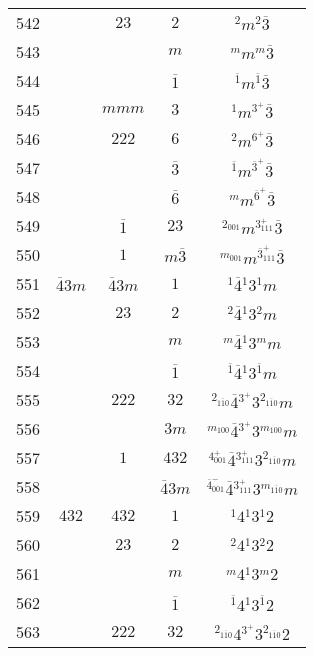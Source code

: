 \begin{longtable}{ccccc}
  542 &  & $23$ & $2$ & ${}^{2} m {}^{2} \overline{3} $\\
  543 &  &  & $m$ & ${}^{m} m {}^{m} \overline{3} $\\
  544 &  &  & $\overline{1}$ & ${}^{\overline{1}} m {}^{\overline{1}} \overline{3} $\\
  545 &  & $mmm$ & $3$ & ${}^{1} m {}^{3^{+}} \overline{3} $\\
  546 &  & $222$ & $6$ & ${}^{2} m {}^{6^{+}} \overline{3} $\\
  547 &  &  & $\overline{3}$ & ${}^{\overline{1}} m {}^{\overline{3}^{+}} \overline{3} $\\
  548 &  &  & $\overline{6}$ & ${}^{m} m {}^{\overline{6}^{+}} \overline{3} $\\
  549 &  & $\overline{1}$ & $23$ & ${}^{2_{001}} m {}^{3^{+}_{111}} \overline{3} $\\
  550 &  & $1$ & $m\overline{3}$ & ${}^{m_{001}} m {}^{\overline{3}^{+}_{111}} \overline{3} $\\
  551 & $\overline{4}3m$ & $\overline{4}3m$ & $1$ & ${}^{1} \overline{4} {}^{1} 3 {}^{1} m $\\
  552 &  & $23$ & $2$ & ${}^{2} \overline{4} {}^{1} 3 {}^{2} m $\\
  553 &  &  & $m$ & ${}^{m} \overline{4} {}^{1} 3 {}^{m} m $\\
  554 &  &  & $\overline{1}$ & ${}^{\overline{1}} \overline{4} {}^{1} 3 {}^{\overline{1}} m $\\
  555 &  & $222$ & $32$ & ${}^{2_{1\overline{1}0}} \overline{4} {}^{3^{+}} 3 {}^{2_{1\overline{1}0}} m $\\
  556 &  &  & $3m$ & ${}^{m_{100}} \overline{4} {}^{3^{+}} 3 {}^{m_{100}} m $\\
  557 &  & $1$ & $432$ & ${}^{4^{+}_{001}} \overline{4} {}^{3^{+}_{111}} 3 {}^{2_{1\overline{1}0}} m $\\
  558 &  &  & $\overline{4}3m$ & ${}^{\overline{4}^{-}_{001}} \overline{4} {}^{3^{+}_{111}} 3 {}^{m_{1\overline{1}0}} m $\\
  559 & $432$ & $432$ & $1$ & ${}^{1} 4 {}^{1} 3 {}^{1} 2 $\\
  560 &  & $23$ & $2$ & ${}^{2} 4 {}^{1} 3 {}^{2} 2 $\\
  561 &  &  & $m$ & ${}^{m} 4 {}^{1} 3 {}^{m} 2 $\\
  562 &  &  & $\overline{1}$ & ${}^{\overline{1}} 4 {}^{1} 3 {}^{\overline{1}} 2 $\\
  563 &  & $222$ & $32$ & ${}^{2_{1\overline{1}0}} 4 {}^{3^{+}} 3 {}^{2_{1\overline{1}0}} 2 $\\

\end{longtable}
